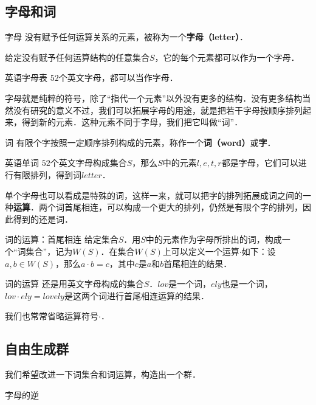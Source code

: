 
\subsection{字母和词}

\begin{definition}{字母}
没有赋予任何运算关系的元素，被称为一个\textbf{字母（letter）}．
\end{definition}

给定没有赋予任何运算结构的任意集合$S$，它的每个元素都可以作为一个字母．

\begin{example}{英语字母表}
$52$个英文字母，都可以当作字母．
\end{example}

字母就是纯粹的符号，除了“指代一个元素”以外没有更多的结构．没有更多结构当然没有研究的意义不过，我们可以拓展字母的用途，就是把若干字母按顺序排列起来，得到新的元素．这种元素不同于字母，我们把它叫做“词”．

\begin{definition}{词}
有限个字按照一定顺序排列构成的元素，称作一个\textbf{词（word）}或\textbf{字}．
\end{definition}

\begin{example}{英语单词}
$52$个英文字母构成集合$S$，那么$S$中的元素$l, e, t, r$都是字母，它们可以进行有限排列，得到词$letter$．
\end{example}

单个字母也可以看成是特殊的词，这样一来，就可以把字的排列拓展成词之间的一种\textbf{运算}．两个词首尾相连，可以构成一个更大的排列，仍然是有限个字的排列，因此得到的还是词．

\begin{definition}{词的运算：首尾相连}
给定集合$S$．用$S$中的元素作为字母所排出的词，构成一个“词集合”，记为$W(S)$．在集合$W(S)$上可以定义一个运算$\cdot$如下：设$a, b\in W(S)$，那么$a\cdot b=c$，其中$c$是$a$和$b$首尾相连的结果．
\end{definition}

\begin{example}{词的运算}
还是用英文字母构成的集合$S$．$lov$是一个词，$ely$也是一个词，$lov\cdot ely=lovely$是这两个词进行首尾相连运算的结果．
\end{example}

我们也常常省略运算符号$\cdot$．

\subsection{自由生成群}

我们希望改进一下词集合和词运算，构造出一个群．

\begin{definition}{字母的逆}

\end{definition}

